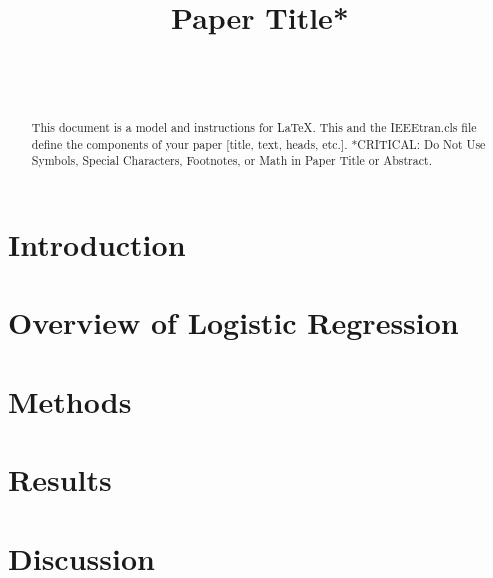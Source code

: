 \documentclass[journal,12pt,onecolumn]{IEEEtran} %
\begin{document}
\title{Paper Title*}

\author{%
    \\%
    \\%
}

\maketitle
\clearpage

\begin{abstract}
    This document is a model and instructions for \LaTeX.
    This and the IEEEtran.cls file define the components of your paper [title, text, heads, etc.]. *CRITICAL: Do Not Use Symbols, Special Characters, Footnotes,
    or Math in Paper Title or Abstract.
\end{abstract}
\clearpage


\section{Introduction}


\section{Overview of Logistic Regression}


\section{Methods}


\section{Results}


\section{Discussion}



\clearpage

\singlespacing



\clearpage
\onecolumn

\appendix
\renewcommand{\thesection}{\Alph{section}}
\end{document}
